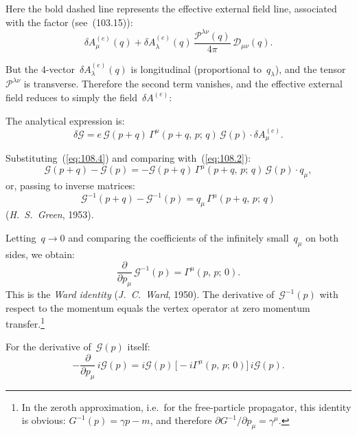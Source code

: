 \noindent Here the bold dashed line represents the effective external field line, associated with the factor (see~(103.15)):
\[
\delta A^{(e)}_\mu(q) + \delta A^{(e)}_\lambda(q)\,\frac{\mathcal{P}^{\lambda\nu}(q)}{4\pi}\,\mathcal{D}_{\mu\nu}(q).
\]


\noindent But the 4-vector~$\delta A^{(e)}_\lambda(q)$ is longitudinal (proportional to~$q_\lambda$), and the tensor~$\mathcal{P}^{\lambda\nu}$ is transverse. Therefore the second term vanishes, and the effective external field reduces to simply the field~$\delta A^{(e)}$:


\noindent The analytical expression is:
\begin{equation}
\delta\mathcal{G} = e\,\mathcal{G}(p + q)\,\Gamma^\mu(p + q,\, p;\, q)\,\mathcal{G}(p)\cdot\delta A^{(e)}_\mu.
\label{eq:108.6}
\end{equation}

Substituting~(\ref{eq:108.4}) and comparing with~(\ref{eq:108.2}):
\[
\mathcal{G}(p + q) - \mathcal{G}(p) = -\mathcal{G}(p + q)\,\Gamma^\mu(p + q,\, p;\, q)\,\mathcal{G}(p)\cdot q_\mu,
\]
or, passing to inverse matrices:
\begin{equation}
\mathcal{G}^{-1}(p + q) - \mathcal{G}^{-1}(p) = q_\mu\,\Gamma^\mu(p + q,\, p;\, q)
\label{eq:108.7}
\end{equation}
(\emph{H.~S.~Green}, 1953).

Letting~$q \to 0$ and comparing the coefficients of the infinitely small~$q_\mu$ on both sides, we obtain:
\begin{equation}
\frac{\partial}{\partial p_\mu}\,\mathcal{G}^{-1}(p) = \Gamma^\mu(p,\, p;\, 0).
\label{eq:108.8}
\end{equation}
This is the \emph{Ward identity} (\emph{J.~C.~Ward}, 1950). The derivative of~$\mathcal{G}^{-1}(p)$ with respect to the momentum equals the vertex operator at zero momentum transfer.\footnote{In the zeroth approximation, i.e.\ for the free-particle propagator, this identity is obvious: $G^{-1}(p) = \gamma p - m$, and therefore $\partial G^{-1}/\partial p_\mu = \gamma^\mu$.}


For the derivative of~$\mathcal{G}(p)$ itself:
\begin{equation}
-\frac{\partial}{\partial p_\mu}\,i\mathcal{G}(p) = i\mathcal{G}(p)\,\bigl[-i\Gamma^\mu(p,\, p;\, 0)\bigr]\,i\mathcal{G}(p).
\label{eq:108.9}
\end{equation}

